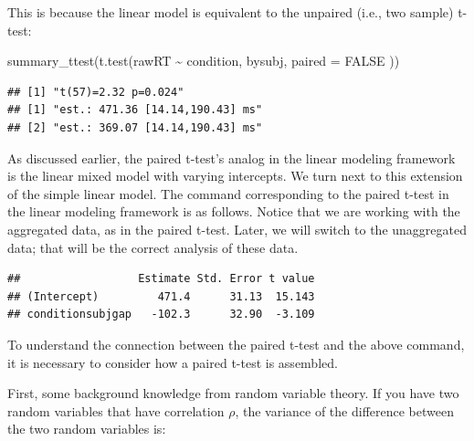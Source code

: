 \documentclass[
  12pt,
]{krantz}
\newenvironment{Shaded}{\begin{snugshade}}{\end{snugshade}}
\newcommand{\AttributeTok}[1]{\textcolor[rgb]{0.77,0.63,0.00}{#1}}
\newcommand{\ConstantTok}[1]{\textcolor[rgb]{0.00,0.00,0.00}{#1}}
\newcommand{\DecValTok}[1]{\textcolor[rgb]{0.00,0.00,0.81}{#1}}
\newcommand{\FunctionTok}[1]{\textcolor[rgb]{0.00,0.00,0.00}{#1}}
\newcommand{\NormalTok}[1]{#1}
\newcommand{\OtherTok}[1]{\textcolor[rgb]{0.56,0.35,0.01}{#1}}
\newcommand{\SpecialCharTok}[1]{\textcolor[rgb]{0.00,0.00,0.00}{#1}}
\theoremstyle{definition}
\theoremstyle{definition}
\theoremstyle{definition}
\theoremstyle{definition}
\theoremstyle{remark}
\begin{document}
This is because the linear model is equivalent to the unpaired (i.e., two sample) t-test:

\begin{Shaded}
\begin{Highlighting}[]
\FunctionTok{summary\_ttest}\NormalTok{(}\FunctionTok{t.test}\NormalTok{(rawRT }\SpecialCharTok{\textasciitilde{}}\NormalTok{ condition, bysubj,}
  \AttributeTok{paired =} \ConstantTok{FALSE}
\NormalTok{))}
\end{Highlighting}
\end{Shaded}

\begin{verbatim}
## [1] "t(57)=2.32 p=0.024"
## [1] "est.: 471.36 [14.14,190.43] ms"
## [2] "est.: 369.07 [14.14,190.43] ms"
\end{verbatim}

As discussed earlier, the paired t-test's analog in the linear modeling framework is the linear mixed model with varying intercepts. We turn next to this extension of the simple linear model. The command corresponding to the paired t-test in the linear modeling framework is as follows. Notice that we are working with the aggregated data, as in the paired t-test. Later, we will switch to the unaggregated data; that will be the correct analysis of these data.

\begin{Shaded}
\end{Shaded}

\begin{verbatim}
##                  Estimate Std. Error t value
## (Intercept)         471.4      31.13  15.143
## conditionsubjgap   -102.3      32.90  -3.109
\end{verbatim}

To understand the connection between the paired t-test and the above command, it is necessary to consider how a paired t-test is assembled.

First, some background knowledge from random variable theory. If you have two random variables that have correlation \(\rho\), the variance of the difference between the two random variables is:
\end{document}
